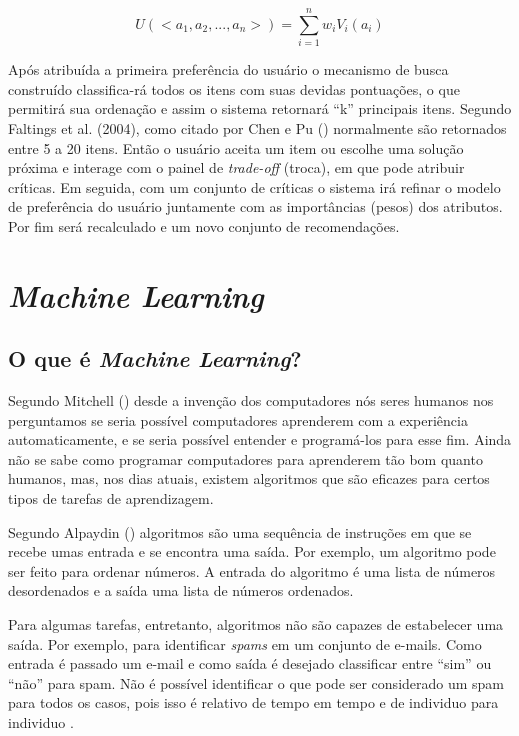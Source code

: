 \begin{equation}
    \label{funcaoUtilidade}
    U(<a_1,a_2,...,a_n>)=\sum_{i=1}^{n} w_i V_i(a_i)
\end{equation}

Após atribuída a primeira preferência do usuário o mecanismo de busca construído classifica-rá todos os itens com suas devidas pontuações, o que permitirá sua ordenação e assim o sistema retornará “k” principais itens. Segundo Faltings et al. (2004), como citado por Chen e Pu (\citeyear{Chen:2012}) normalmente são retornados entre 5 a 20 itens. Então o usuário aceita um item ou escolhe uma solução próxima e interage com o painel de \textit{trade-off} (troca), em que pode atribuir críticas. Em seguida, com um conjunto de críticas o sistema irá refinar o modelo de preferência do usuário juntamente com as importâncias (pesos) dos atributos. Por fim será recalculado e um novo conjunto de recomendações.

\section{\textit{Machine Learning}}
\label{machineLearning}
\subsection{O que é \textit{Machine Learning}?}

Segundo Mitchell (\citeyear{Mitchell:1997:ML:541177}) desde a invenção dos computadores nós seres humanos nos perguntamos se seria possível computadores aprenderem com a experiência automaticamente, e se seria possível entender e programá-los para esse fim. Ainda não se sabe como programar computadores para aprenderem tão bom quanto humanos, mas, nos dias atuais, existem algoritmos que são eficazes para certos tipos de tarefas de aprendizagem. 

Segundo Alpaydin (\citeyear{Alpaydin:2010:IML:1734076}) algoritmos são uma sequência de instruções em que se recebe umas entrada e se encontra uma saída. Por exemplo, um algoritmo pode ser feito para ordenar números. A entrada do algoritmo é uma lista de números desordenados e a saída uma lista de números ordenados.

Para algumas tarefas, entretanto, algoritmos não são capazes de estabelecer uma saída. Por exemplo, para identificar \textit{spams} em um conjunto de e-mails. Como entrada é passado um e-mail e como saída é desejado classificar entre “sim” ou “não” para spam. Não é possível identificar o que pode ser considerado um spam para todos os casos, pois isso é relativo de tempo em tempo e de individuo para individuo \cite{Alpaydin:2010:IML:1734076}.

